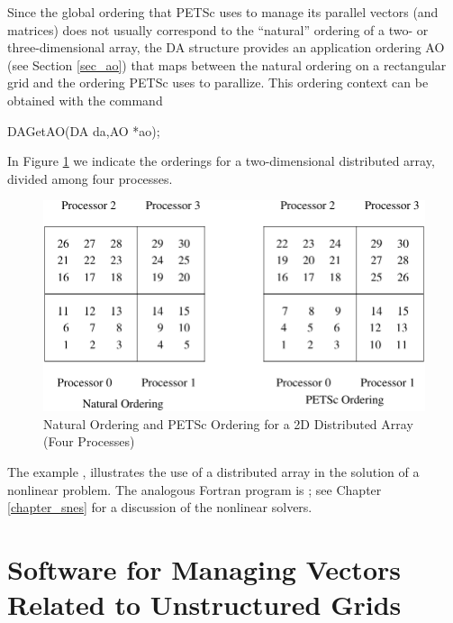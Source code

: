 Since the global ordering that PETSc uses to manage its parallel vectors 
(and matrices) does not usually correspond to the ``natural'' ordering 
of a two- or three-dimensional array, the DA structure provides 
an application ordering AO (see Section \ref{sec_ao}) that maps 
between the natural ordering on a rectangular grid and the ordering PETSc
uses to parallize. This ordering context can be obtained with the command
\begin{tabbing}
  DAGetAO(DA da,AO *ao);
\end{tabbing}
In Figure \ref{fig_daao} we indicate the orderings for a two-dimensional distributed 
array, divided among four processes.

\begin{figure}[tb]
\centerline{ \includegraphics{danumbering}}
\caption{Natural Ordering and PETSc Ordering for a 2D Distributed Array (Four Processes)}
\label{fig_daao}
\end{figure}

The example
,
illustrates the use of a distributed array in the solution of
a nonlinear problem.  The analogous Fortran program is
\break {};
see Chapter \ref{chapter_snes} for a discussion of the nonlinear
solvers.


\section{Software for Managing Vectors Related to Unstructured Grids}
\label{sec_unstruct}

